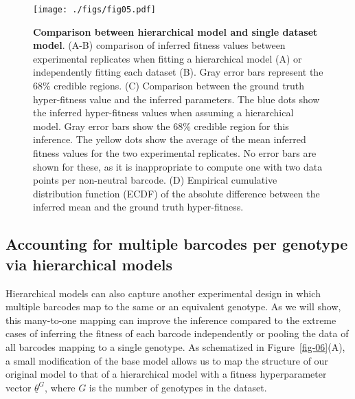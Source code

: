 \documentclass[
]{scrartcl}
\begin{document}
\begin{refsegment}
\begin{figure}
{\centering \texttt{[image: ./figs/fig05.pdf]}

}

\caption{\label{fig-05}\textbf{Comparison between hierarchical model and
single dataset model}. (A-B) comparison of inferred fitness values
between experimental replicates when fitting a hierarchical model (A) or
independently fitting each dataset (B). Gray error bars represent the
68\% credible regions. (C) Comparison between the ground truth
hyper-fitness value and the inferred parameters. The blue dots show the
inferred hyper-fitness values when assuming a hierarchical model. Gray
error bars show the 68\% credible region for this inference. The yellow
dots show the average of the mean inferred fitness values for the two
experimental replicates. No error bars are shown for these, as it is
inappropriate to compute one with two data points per non-neutral
barcode. (D) Empirical cumulative distribution function (ECDF) of the
absolute difference between the inferred mean and the ground truth
hyper-fitness.}

\end{figure}

\hypertarget{sec-genotypes}{%
\subsection{Accounting for multiple barcodes per genotype via
hierarchical models}\label{sec-genotypes}}

Hierarchical models can also capture another experimental design in
which multiple barcodes map to the same or an equivalent genotype. As we
will show, this many-to-one mapping can improve the inference compared
to the extreme cases of inferring the fitness of each barcode
independently or pooling the data of all barcodes mapping to a single
genotype. As schematized in Figure~\ref{fig-06}(A), a small modification
of the base model allows us to map the structure of our original model
to that of a hierarchical model with a fitness hyperparameter vector
\(\underline{\theta}^G\), where \(G\) is the number of genotypes in the
dataset.


\end{refsegment}
\end{document}
